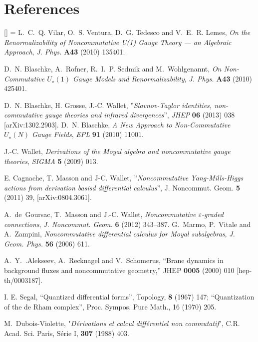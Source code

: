 \documentclass[a4paper,11pt]{article}
\numberwithin{equation}{section}
\renewenvironment{thebibliography}[1]
         {\section*{References}\frenchspacing\small
          \begin{list}{[\arabic{enumi}]}
         {\usecounter{enumi}\parsep=2pt\topsep 0pt
         \settowidth{\labelwidth}{[#1]}
         \leftmargin=\labelwidth\advance\leftmargin\labelsep
         \rightmargin=0pt\itemsep=1pt\sloppy}}{\end{list}}
\theoremstyle{nonumberplain}
\begin{document}
\begin{thebibliography}{50}
L.~C.~Q. Vilar, O.~S. Ventura, D.~G. Tedesco and V.~E.~R. Lemes, \textit{{On
  the Renormalizability of Noncommutative U(1) Gauge Theory --- an Algebraic
  Approach}}, \textit{J. Phys.} \textbf{A43} (2010) 135401.

D.~N. Blaschke, A.~Rofner, R.~I.~P. Sedmik and M.~Wohlgenannt, \textit{{On
  Non-Commutative $U_\star(1)$ Gauge Models and Renormalizability}}, \textit{J.
  Phys.} \textbf{A43} (2010) 425401.

 D.~N. Blaschke, H. Grosse, J.-C. Wallet, ''{\it{Slavnov-Taylor identities, non-commutative gauge theories and infrared divergences}}'', \textit{JHEP} \textbf{06} (2013) 038 [arXiv:1302.2903].
D.~N. Blaschke, \textit{{A New Approach to Non-Commutative $U_\star(N)$ Gauge
  Fields}}, \textit{EPL} \textbf{91} (2010) 11001.



J.-C. Wallet, \textit{{Derivations of the Moyal algebra and noncommutative
  gauge theories}}, \textit{SIGMA} \textbf{5} (2009) 013.

E. Cagnache, T. Masson and J-C. Wallet, ''{\it{Noncommutative Yang-Mills-Higgs actions from derivation basisd differential calculus}}'', J. Noncommut. Geom. {\bf{5}} (2011) 39, [arXiv:0804.3061].

A.~de~Goursac, T.~Masson and J.-C. Wallet, \textit{{Noncommutative
  $\varepsilon$-graded connections}},
  \textit{J. Noncommut. Geom.} \textbf{6} (2012) 343--387.
G.~Marmo, P.~Vitale and A.~Zampini, \textit{{Noncommutative differential
  calculus for Moyal subalgebras}}, \textit{J. Geom. Phys.} \textbf{56} (2006)
  611.


 A.~Y.~.Alekseev, A.~Recknagel and V.~Schomerus,
  ``Brane dynamics in background fluxes and noncommutative geometry,''
  JHEP {\bf 0005} (2000) 010
  [hep-th/0003187].
  
  I. E. Segal, ``Quantized differential forms'', Topology, {\bf 8} (1967) 147; ``Quantization of the
de Rham complex'', Proc. Sympos. Pure Math., 16 (1970) 205.



 M.~Dubois-Violette, "{\it{D\'erivations et calcul diff\'erentiel non commutatif}}", C.R. Acad. Sci. Paris, S\'erie I, {\bf{307}} (1988) 403.


\end{thebibliography}
\end{document}
